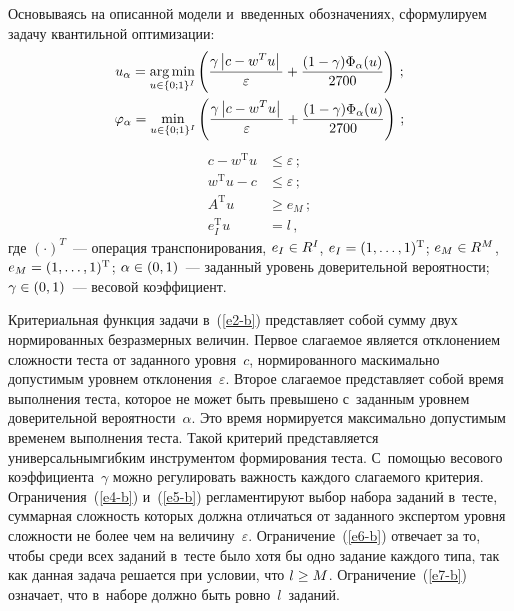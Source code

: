 \begin{multicols}{2}
    Основываясь на описанной модели и~введенных обозначениях, 
сформулируем задачу квантильной оптимизации:
    \begin{gather} 
    u_\alpha = \argmin\limits_{u\in \{0;1\}^I} \left( \fr{\gamma\left\vert c-w^T 
u\right\vert}{\varepsilon} +\fr{(1-\gamma)\Phi_\alpha (u)}{2700}\right)\,;\label{e2-b}\\
     \varphi_\alpha = \min\limits_{u\in\{ 0;1\}^I} \left( \fr{\gamma\left\vert c- w^T 
u\right\vert}{\varepsilon} +\fr{(1-\gamma)\Phi_\alpha(u)}{2700}\right)\,;\notag %
\end{gather}
\begin{align}
    c-w^{\mathrm{T}} u&\leq \varepsilon\,;\label{e4-b}\\
    w^{\mathrm{T}}u-c&\leq \varepsilon\,;\label{e5-b}\\
    A^{\mathrm{T}}u&\geq e_M\,;\label{e6-b}\\
    e_I^{\mathrm{T}} u&=l\,,\label{e7-b}
    \end{align}
где $(\cdot )^T$~--- операция транспонирования, $e_I\hm\in {R}^I$, 
$e_I\hm= (1,\ldots , 1)^{\mathrm{T}}$;
 $e_M\hm\in {R}^M$, $e_M\hm= (1,\ldots 
,1)^{\mathrm{T}}$; $\alpha\hm \in (0,1)$~--- заданный уровень доверительной вероятности; 
$\gamma\hm\in (0,1)$~--- весовой коэффициент.

    Критериальная функция задачи в~(\ref{e2-b}) пред\-став\-ля\-ет собой сумму 
двух нормированных безразмерных величин. Первое слагаемое является 
отклонением сложности теста от заданного уровня~$c$, нормированного 
маскимально допустимым уровнем отклонения~$\varepsilon$. Второе слагаемое 
представляет собой время выполнения тес\-та, которое не может\linebreak
 быть 
превышено с~заданным уровнем доверительной вероятности~$\alpha$. Это 
время нормируется максимально допустимым временем выполнения тес\-та. 
Такой критерий представляется универсальным\linebreak гибким инструментом 
формирования теста. С~по\-мощью весового коэффициента~$\gamma$ можно 
регулировать важность каждого слагаемого критерия. Ограничения~(\ref{e4-b}) 
и~(\ref{e5-b}) регламентируют выбор набора заданий в~тесте, суммарная 
сложность которых должна отличаться от заданного экспертом уровня 
сложности не более чем на величину~$\varepsilon$. Ограничение~(\ref{e6-b}) 
отвечает за то, чтобы среди всех заданий в~тес\-те было хотя бы одно задание 
каждого типа, так как данная задача решается при условии, что $l\hm \geq M$. 
Ограничение~(\ref{e7-b}) означает, что в~наборе должно быть 
ровно~$l$~заданий.
    

\end{multicols}
